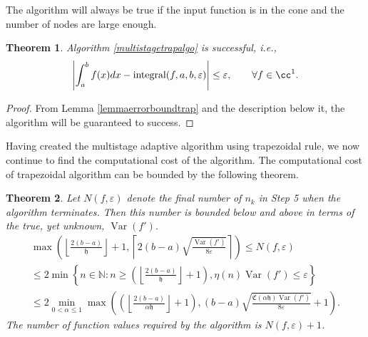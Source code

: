 \documentclass[draft]{iitthesis}
\DeclareMathOperator{\Var}{Var}
\newtheorem{theorem}{Theorem}
\theoremstyle{definition}
\theoremstyle{remark}
\begin{document}
The algorithm will always be true if the input function is in the cone and the number of nodes are large enough.
\begin{theorem}\label{thmTrap}
    Algorithm \ref{multistagetrapalgo} is successful, i.e.,
    \begin{equation*}
      \left|\int_{a}^{b}f(x)dx-\textup{integral}(f,a,b,\varepsilon)\right|\le\varepsilon, \qquad \forall f\in \cc^1.
    \end{equation*}
\end{theorem}
\begin{proof}
  From Lemma \ref{lemmaerrorboundtrap} and the description below it, the algorithm will be guaranteed to success.
\end{proof}


Having created the multistage adaptive algorithm using trapezoidal rule, we now continue to find the computational cost of the algorithm. The computational cost of trapezoidal algorithm can be bounded by the following theorem.
\begin{theorem}\label{uppbndcosttrap}
    Let $N(f,\varepsilon)$ denote the final number of $n_k$ in Step 5 when the algorithm terminates. Then this number is bounded below and above in terms of the true, yet unknown, $\Var(f')$.
    \begin{multline}\label{uppbndcosttrapineq}
        \max\left(\left\lfloor\frac{2(b-a)}{\mathfrak{h}}\right\rfloor+1,\left\lceil2(b-a)\sqrt{\frac{\Var(f')}{8\varepsilon}}\right\rceil\right)\leq N(f,\varepsilon)\\ \leq 2\min\left\{n\in\mathbb{N}:n\geq\left(\left\lfloor\frac{2(b-a)}{\mathfrak{h}}\right\rfloor+1\right),\eta(n)\Var(f')\leq\varepsilon\right\}\\ \leq 2\min_{0<\alpha\leq1}\max\left(\left(\left\lfloor\frac{2(b-a)}{\alpha\mathfrak{h}}\right\rfloor+1\right),(b-a)\sqrt{\frac{\mathfrak{C}(\alpha\mathfrak{h})\Var(f')}{8\varepsilon}}+1\right).
    \end{multline}
    The number of function values required by the algorithm is $N(f,\varepsilon)+1$.
\end{theorem}
\end{document}
